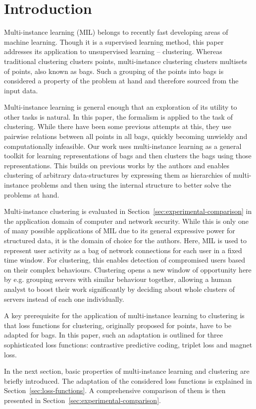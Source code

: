 \section{Introduction}

Multi-instance learning (MIL) belongs to recently fast developing areas of machine learning. Though it is a supervised learning method, this paper addresses its application to unsupervised learning -- clustering. Whereas traditional clustering clusters points, multi-instance clustering clusters multisets of points, also known as bags. Such a grouping of the points into bags is considered a property of the problem at hand and therefore sourced from the input data.

Multi-instance learning is general enough that an exploration of its utility to other tasks is natural. In this paper, the formalism is applied to the task of clustering. While there have been some previous attempts at this, they use pairwise relations between all points in all bags, quickly becoming unwieldy and computationally infeasible. Our work uses multi-instance learning as a general toolkit for learning representations of bags and then clusters the bags using those representations. This builds on previous works by the authors and enables clustering of arbitrary data-structures by expressing them as hierarchies of multi-instance problems and then using the internal structure to better solve the problems at hand.

Multi-instance clustering is evaluated in Section~\ref{sec:experimental-comparison} in the application domain of computer and network security. While this is only one of many possible applications of MIL due to its general expressive power for structured data, it is the domain of choice for the authors. Here, MIL is used to represent user activity as a bag of network connections for each user in a fixed time window. For clustering, this enables detection of compromised users based on their complex behaviours. Clustering opens a new window of opportunity here by e.g. grouping servers with similar behaviour together, allowing a human analyst to boost their work significantly by deciding about whole clusters of servers instead of each one individually.

A key prerequisite for the application of multi-instance learning to clustering is that loss functions for clustering, originally proposed for points, have to be adapted for bags. In this paper, such an adaptation is outlined for three sophisticated loss functions: contrastive predictive coding, triplet loss and magnet loss.

In the next section, basic properties of multi-instance learning and clustering are briefly introduced. The adaptation of the considered loss functions is explained in Section~\ref{sec:loss-functions}. A comprehensive comparison of them is then presented in Section~\ref{sec:experimental-comparison}.
